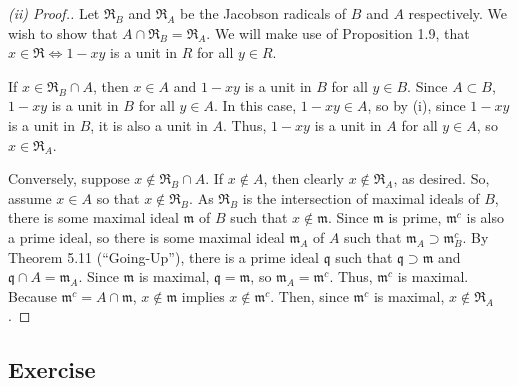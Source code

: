 \begin{proof}[(ii) Proof.]
Let $\mathfrak{R}_B$ and $\mathfrak{R}_A$ be the Jacobson radicals of $B$ and $A$ respectively. We wish to show that $A \cap \mathfrak{R}_B = \mathfrak{R}_A$.
We will make use of Proposition 1.9, that $x \in \mathfrak{R} \iff 1 - xy$ is a unit in $R$ for all $y \in R$.

If $x \in \mathfrak{R}_B \cap A$, then $x \in A$ and $1 - xy$ is a unit in $B$ for all $y \in B$. Since $A \subset B$, $1 - xy$ is a unit in $B$
for all $y \in A$. In this case, $1 - xy \in A$, so by (i), since $1 - xy$ is a unit in $B$, it is also a unit in $A$. Thus, $1 - xy$ is a unit
in $A$ for all $y \in A$, so $x \in \mathfrak{R}_A$.

Conversely, suppose $x \not\in \mathfrak{R}_B \cap A$. If $x \not\in A$, then clearly $x \not\in \mathfrak{R}_A$, as desired. So, assume $x \in A$
so that $x \not\in \mathfrak{R}_B$. As $\mathfrak{R}_B$ is the intersection of maximal ideals of $B$, there is some maximal ideal $\mathfrak{m}$ of
$B$ such that $x \not\in \mathfrak{m}$. Since $\mathfrak{m}$ is prime, $\mathfrak{m}^c$ is also a prime ideal, so there is some maximal ideal 
$\mathfrak{m}_A$ of $A$ such that $\mathfrak{m}_A \supset \mathfrak{m}_B^c$. By Theorem 5.11 (``Going-Up''), there is a prime ideal $\mathfrak{q}$ such that
$\mathfrak{q} \supset \mathfrak{m}$ and $\mathfrak{q} \cap A = \mathfrak{m}_A$. Since $\mathfrak{m}$ is maximal, $\mathfrak{q} = \mathfrak{m}$, so 
$\mathfrak{m}_A = \mathfrak{m}^c$. Thus, $\mathfrak{m}^c$ is maximal. Because $\mathfrak{m}^c = A \cap \mathfrak{m}$, $x \not\in \mathfrak{m}$
implies $x \not\in \mathfrak{m}^c$. Then, since $\mathfrak{m}^c$ is maximal, $x \not\in \mathfrak{R}_A$.
\end{proof}

\subsection{Exercise}\label{5.6}


